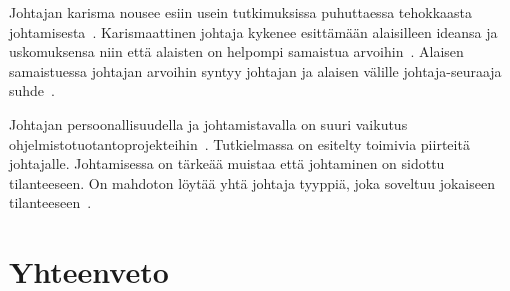 \documentclass[finnish]{tktltiki2}
\theoremstyle{definition}
\theoremstyle{remark}
\begin{document}
Johtajan karisma nousee esiin usein tutkimuksissa puhuttaessa tehokkaasta johtamisesta~\cite{Dhomne:2012:ITL:2382887.2382899, thite2000leadership}. Karismaattinen johtaja kykenee esittämään alaisilleen ideansa ja uskomuksensa niin että alaisten on helpompi samaistua arvoihin~\cite{thite2000leadership}. Alaisen samaistuessa johtajan arvoihin syntyy johtajan ja alaisen välille johtaja-seuraaja suhde~\cite{raccoon2006leadership}.  

Johtajan persoonallisuudella ja johtamistavalla on suuri vaikutus ohjelmistotuotantoprojekteihin~\cite{Wang:2009:PMP:1639950.1640049}. Tutkielmassa on esitelty toimivia piirteitä johtajalle. Johtamisessa on tärkeää muistaa että johtaminen on sidottu tilanteeseen. On mahdoton löytää yhtä johtaja tyyppiä, joka soveltuu jokaiseen tilanteeseen~\cite{thite2000leadership}.

  




\section{Yhteenveto}







 











%

%
% 
%



\end{document}
